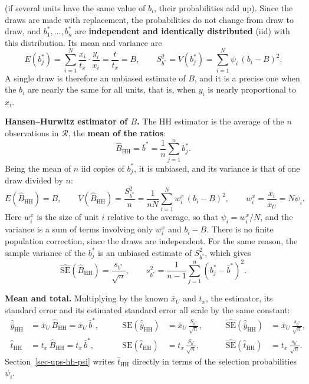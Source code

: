 \documentclass[
  letterpaper,
  DIV=11,
  numbers=noendperiod]{scrreprt}
\renewcommand{\[}{\begin{equation}}
\renewcommand{\]}{\end{equation}}
\begin{document}
(if several units have the same value of \(b_i\), their probabilities
add up). Since the draws are made with replacement, the probabilities do
not change from draw to draw, and \(b_1^*,\ldots,b_n^*\) are
\textbf{independent and identically distributed} (iid) with this
distribution. Its mean and variance are \[
E(b_j^*)=\sum_{i=1}^N\frac{x_i}{t_x}\cdot\frac{y_i}{x_i}=\frac{t}{t_x}=B,\qquad
S_{b^*}^2=V(b_j^*)=\sum_{i=1}^N\psi_i\,(b_i-B)^2 .
\] A single draw is therefore an unbiased estimate of \(B\), and it is a
precise one when the \(b_i\) are nearly the same for all units, that is,
when \(y_i\) is nearly proportional to \(x_i\).

\textbf{Hansen--Hurwitz estimator of \(B\).} The HH estimator is the
average of the \(n\) observations in \(\mathcal{R}\), the \textbf{mean
of the ratios}: \[
\boxed{\hat{B}_{\mathrm{HH}}=\bar{b}^*=\frac{1}{n}\sum_{j=1}^n b_j^*} .
\] Being the mean of \(n\) iid copies of \(b_j^*\), it is unbiased, and
its variance is that of one draw divided by \(n\): \[
E(\hat{B}_{\mathrm{HH}})=B,\qquad
V(\hat{B}_{\mathrm{HH}})=\frac{S_{b^*}^2}{n}=\frac{1}{nN}\sum_{i=1}^N w^x_i\,(b_i-B)^2 ,
\qquad w^x_i=\frac{x_i}{\bar{x}_U}=N\psi_i .
\] Here \(w^x_i\) is the size of unit \(i\) relative to the average, so
that \(\psi_i=w^x_i/N\), and the variance is a sum of terms involving
only \(w^x_i\) and \(b_i-B\). There is no finite population correction,
since the draws are independent. For the same reason, the sample
variance of the \(b_j^*\) is an unbiased estimate of \(S_{b^*}^2\),
which gives \[
\boxed{\widehat{\mathrm{SE}}(\hat{B}_{\mathrm{HH}})=\frac{s_{b^*}}{\sqrt{n}}},\qquad
s_{b^*}^2=\frac{1}{n-1}\sum_{j=1}^n\left(b_j^*-\bar{b}^*\right)^2 .
\]

\textbf{Mean and total.} Multiplying by the known \(\bar{x}_U\) and
\(t_x\), the estimator, its standard error and its estimated standard
error all scale by the same constant: \[
\boxed{\;
\begin{aligned}
\hat{\bar{y}}_{\mathrm{HH}}&=\bar{x}_U\,\hat{B}_{\mathrm{HH}}=\bar{x}_U\,\bar{b}^*,\qquad
&\mathrm{SE}(\hat{\bar{y}}_{\mathrm{HH}})&=\bar{x}_U\,\frac{S_{b^*}}{\sqrt{n}},\qquad
&\widehat{\mathrm{SE}}(\hat{\bar{y}}_{\mathrm{HH}})&=\bar{x}_U\,\frac{s_{b^*}}{\sqrt{n}},\\[4pt]
\hat{t}_{\mathrm{HH}}&=t_x\,\hat{B}_{\mathrm{HH}}=t_x\,\bar{b}^*,\qquad
&\mathrm{SE}(\hat{t}_{\mathrm{HH}})&=t_x\,\frac{S_{b^*}}{\sqrt{n}},\qquad
&\widehat{\mathrm{SE}}(\hat{t}_{\mathrm{HH}})&=t_x\,\frac{s_{b^*}}{\sqrt{n}} .
\end{aligned}\;}
\] Section~\ref{sec-ups-hh-psi} writes \(\hat{t}_{\mathrm{HH}}\)
directly in terms of the selection probabilities \(\psi_i\).
\end{document}
